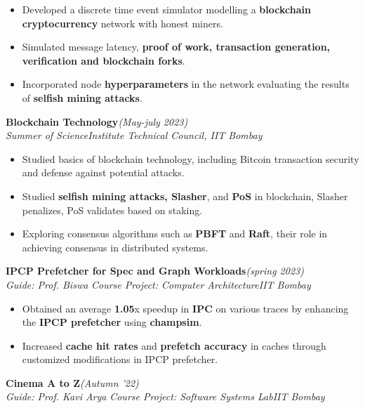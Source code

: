 \documentclass[10 pt]{article}
\begin{document}
		\begin{itemize}[itemsep = -0.8 mm, leftmargin=*]
		\vspace{-16pt}
		\item  Developed a discrete time event simulator modelling a \textbf{blockchain cryptocurrency} network with honest miners.
		\item Simulated message latency, \textbf{proof of work, transaction generation, verification and blockchain forks}.
      \item Incorporated node \textbf{hyperparameters} in the network evaluating the results of \textbf{selfish mining attacks}.
	\end{itemize}
 {\selectfont
		\textbf{{Blockchain Technology}}\hfill{\sl \small (May-july 2023)}\\
	}{\it Summer of Science}\hfill{\sl \small Institute Technical Council, IIT Bombay}\\

		\begin{itemize}[itemsep = -0.8 mm, leftmargin=*]
		\vspace{-16pt}
		\item  Studied basics of blockchain technology, including Bitcoin transaction security and defense against potential attacks.
  \item Studied \textbf{selfish mining attacks, Slasher}, and \textbf{PoS} in blockchain, Slasher penalizes, PoS validates based on staking.
  \item Exploring consensus algorithms such as \textbf{PBFT} and \textbf{Raft}, their role in achieving consensus in distributed systems.
	\end{itemize}
 	{\selectfont
		\textbf{{IPCP Prefetcher for Spec and Graph Workloads}}\hfill{\sl \small (spring 2023)}\\
	}{\it Guide: Prof. Biswa \textbar} {\it Course Project:  Computer Architecture}\hfill{\sl \small IIT Bombay}\\
	\begin{itemize}[itemsep = -0.8 mm, leftmargin=*]
		\vspace{-16pt}
		\item Obtained an average \textbf{1.05}x speedup in \textbf{IPC} on various traces by enhancing the \textbf{IPCP prefetcher} using \textbf{champsim}.
		\item Increased \textbf{cache hit rates} and \textbf{prefetch accuracy} in caches through customized modifications in IPCP prefetcher.
	\end{itemize}
{\selectfont
		\textbf{{Cinema A to Z}}\hfill{\sl \small (Autumn '22)}\\
	}{\it Guide: Prof. Kavi Arya \textbar} {\it Course Project: Software Systems Lab}\hfill{\sl \small IIT Bombay}\\
\end{document}
